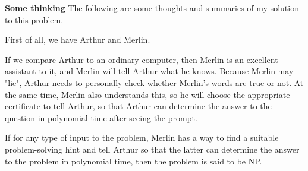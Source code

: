 \documentclass[11pt]{article}
\begin{document}
{\bf Some thinking} The following are some thoughts and summaries of my solution to this problem.

First of all, we have Arthur and Merlin. 

If we compare Arthur to an ordinary computer, then Merlin is an excellent assistant to it, and Merlin will tell Arthur what he knows. Because Merlin may "lie", Arthur needs to personally check whether Merlin's words are true or not. At the same time, Merlin also understands this, so he will choose the appropriate certificate to tell Arthur, so that Arthur can determine the answer to the question in polynomial time after seeing the prompt.

If for any type of input to the problem, Merlin has a way to find a suitable problem-solving hint and tell Arthur so that the latter can determine the answer to the problem in polynomial time, then the problem is said to be NP.
\end{document}

